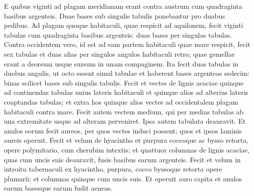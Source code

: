 \begin{biblechapter}
\verse E quibus viginti ad plagam meridianam erant contra austrum 
\verse cum quadraginta basibus argenteis. Duae bases sub singulis tabulis ponebantur pro duabus pedibus. 
\verse Ad plagam quoque habitaculi, quae respicit ad aquilonem, fecit viginti tabulas 
\verse cum quadraginta basibus argenteis: duas bases per singulas tabulas. 
\verse Contra occidentem vero, id est ad eam partem habitaculi quae mare respicit, fecit sex tabulas 
\verse et duas alias per singulos angulos habitaculi retro; 
\verse quae gemellae erant a deorsum usque sursum in unam compaginem. Ita fecit duas tabulas in duobus angulis, 
\verse ut octo essent simul tabulae et haberent bases argenteas sedecim: binas scilicet bases sub singulis tabulis. 
\verse Fecit et vectes de lignis acaciae quinque ad continendas tabulas unius lateris habitaculi  
\verse et quinque alios ad alterius lateris coaptandas tabulas; et extra hos quinque alios vectes ad occidentalem plagam habitaculi contra mare. 
\verse Fecit autem vectem medium, qui per medias tabulas ab una extremitate usque ad alteram perveniret. 
\verse Ipsa autem tabulata deauravit. Et anulos eorum fecit aureos, per quos vectes induci possent; quos et ipsos laminis aureis operuit. 
\verse Fecit et velum de hyacintho et purpura coccoque ac bysso retorta, opere polymitario, cum cherubim intextis; 
\verse et quattuor columnas de lignis acaciae, quas cum uncis suis deauravit, fusis basibus earum argenteis. 
\verse Fecit et velum in introitu tabernaculi ex hyacintho, purpura, cocco byssoque retorta opere plumarii; 
\verse et columnas quinque cum uncis suis. Et operuit auro capita et anulos earum basesque earum fudit aeneas. 
\end{biblechapter}

